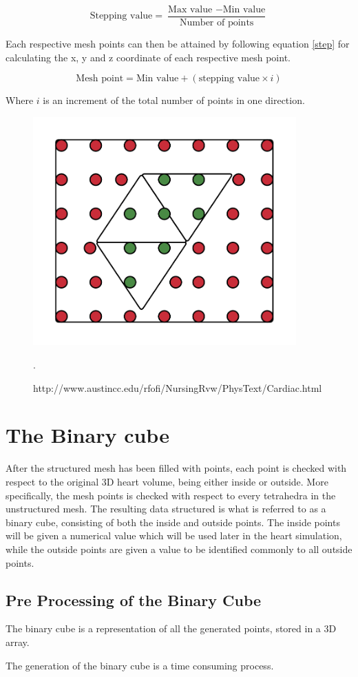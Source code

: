 \begin{equation} \label{step}
\textrm{Stepping value} = \frac{\textrm{Max value } - \textrm{Min value}}{\textrm{Number of points}} 
\end{equation}

Each respective mesh points can then be attained by following equation \ref{step} for calculating the x, y and z coordinate of each respective mesh point.

\begin{equation} \label{step}
\textrm{Mesh point} = \textrm{Min value} + (\textrm{stepping value} \times i)
\end{equation}

Where \(i\) is an increment of the total number of points in one direction. 


\begin{figure}[h]
 \centering 
     \includegraphics[width=0.9\textwidth]{bilder/m_points_inside}
     \caption{http://www.austincc.edu/rfofi/NursingRvw/PhysText/Cardiac.html}.
     \label{m_points_inside.png}
\end{figure}


\section{The Binary cube}
After the structured mesh has been filled with points, each point is checked with respect to the original 3D heart volume, being either inside or outside. More specifically, the mesh points is checked with respect to every tetrahedra in the unstructured mesh. The resulting data structured is what is referred to as a binary cube, consisting of both the inside and outside points. The inside points will be given a numerical value which will be used later in the heart simulation, while the outside points are given a value to be identified commonly to all outside points.

\subsection{Pre Processing of the Binary Cube}
The binary cube is a representation of all the generated points, stored in a 3D array. 

The generation of the binary cube is a time consuming process. 





